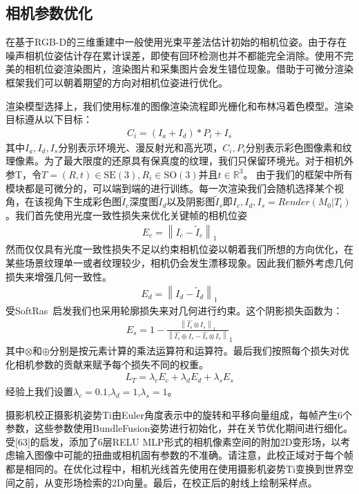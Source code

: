\subsection{相机参数优化}
在基于RGB-D的三维重建中一般使用光束平差法估计初始的相机位姿。由于存在噪声相机位姿估计存在累计误差，即使有回环检测也并不都能完全消除。使用不完美的相机位姿渲染图片，渲染图片和采集图片会发生错位现象。借助于可微分渲染框架我们可以朝着期望的方向对相机位姿进行优化。\par
渲染模型选择上，我们使用标准的图像渲染流程即光栅化和布林冯着色模型。渲染目标遵从以下目标：
\begin{align}
	C_i = (I_a + I_d) * P_i + I_s
\end{align}
其中$I_a,I_d,I_s$分别表示环境光、漫反射光和高光项，$C_i,P_i$分别表示彩色图像素和纹理像素。为了最大限度的还原具有保真度的纹理，我们只保留环境光。对于相机外参T，令$T = (R,t)\in \mathrm{SE} (3),R_i \in \mathrm{SO}(3)$并且$t\in\mathbb{R}^3$。 
由于我们的框架中所有模块都是可微分的，可以端到端的进行训练。每一次渲染我们会随机选择某个视角，在该视角下生成彩色图$\tilde{I}_c$深度图$\tilde{I}_d$以及阴影图$\tilde{I}_s$即$I_c,I_d,I_s = Render(M_0|T_i)$。我们首先使用光度一致性损失来优化关键帧的相机位姿
\begin{align}
	E_c = \left \| I_c - \tilde{I}_c  \right \|_1 
\end{align}
然而仅仅具有光度一致性损失不足以约束相机位姿以朝着我们所想的方向优化，在某些场景纹理单一或者纹理较少，相机仍会发生漂移现象。因此我们额外考虑几何损失来增强几何一致性。
\begin{align}
	E_d = \left \| I_d - \tilde{I}_d  \right \|_1 
\end{align}
受SoftRas~\cite{ShichenLiu2019SoftRA}启发我们也采用轮廓损失来对几何进行约束。这个阴影损失函数为：
\begin{align}
	E_s = 1 - \frac{\left \| \hat{I_s}\otimes I_s  \right \|_1 }{\left \| \hat{I_s}\oplus  I_s- \hat{I_s}\otimes I_s \right \| }_1  
\end{align}
其中$\otimes $和$\oplus $分别是按元素计算的乘法运算符和运算符。最后我们按照每个损失对优化相机参数的贡献来赋予每个损失不同的权重。
\begin{align}
	L_T = \lambda_c E_c + \lambda_d E_d +\lambda_s E_s
\end{align}经验上我们设置$\lambda_c = 0.1$,$\lambda_d = 1$,$\lambda_s = 1$。

摄影机校正摄影机姿势Ti由Euler角度表示中的旋转和平移向量组成，每帧产生6个参数，这些参数使用BundleFusion姿势进行初始化，并在关节优化期间进行细化。受[63]的启发，添加了6层RELU MLP形式的相机像素空间的附加2D变形场，以考虑输入图像中可能的扭曲或相机固有参数的不准确。请注意，此校正域对于每个帧都是相同的。在优化过程中，相机光线首先使用在使用摄影机姿势Ti变换到世界空间之前，从变形场检索的2D向量。最后，在校正后的射线上绘制采样点。

